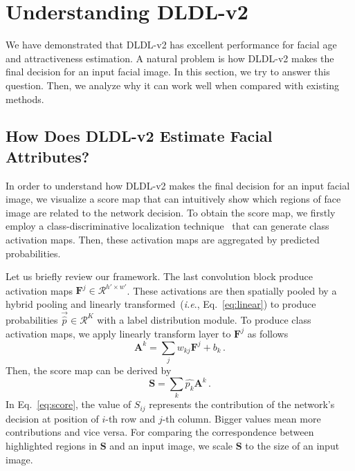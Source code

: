 \documentclass[5p,times,twocolumn]{elsarticle}
\makeatletter
\DeclareRobustCommand\onedot{\@onedot}
\def\@onedot{.}
\def\ie{\emph{i.e}\onedot}
\makeatother
\begin{document}
\section{Understanding DLDL-v2}\label{sec:ud}
We have demonstrated that DLDL-v2 has excellent performance for facial age and attractiveness estimation. A natural problem is how DLDL-v2 makes the final decision for an input facial image. In this section, we try to answer this question. Then, we analyze why it can work well when compared with existing methods.

\subsection{How Does DLDL-v2 Estimate Facial Attributes?}
In order to understand how DLDL-v2 makes the final decision for an input facial image, we visualize a score map that can intuitively show which regions of face image are related to the network decision. To obtain the score map, we firstly employ a class-discriminative localization technique~\cite{zhou2016learning} that can generate class activation maps. Then, these activation maps are aggregated by predicted probabilities. 

Let us briefly review our framework. The last convolution block produce activation maps $\mathbf F^j\in \mathcal R^{h\prime \times w\prime}$. These activations are then spatially pooled by a hybrid pooling and linearly transformed~(\ie, Eq.~\eqref{eq:linear}) to produce probabilities $\vec {\hat p}\in \mathcal R^K$ with a label distribution module. To produce class activation maps, we apply linearly transform layer to $\mathbf F^{j}$ as follows
\begin{equation}\label{eq:classmap}
\mathbf A^k = \sum_j w_{kj}\mathbf F^{j} + b_k\,.
\end{equation}
Then, the score map can be derived by
\begin{equation}\label{eq:score}
\mathbf S = \sum_k \hat {p_k} \mathbf A^k\,.
\end{equation}
In Eq.~\eqref{eq:score}, the value of $S_{ij}$ represents the contribution of the network's decision at position of $i$-th row and $j$-th column. Bigger values mean more contributions and vice versa.  For comparing the correspondence between highlighted regions in $\mathbf S$ and an input image, we scale $\mathbf S$ to the size of an input image. 
\end{document}
